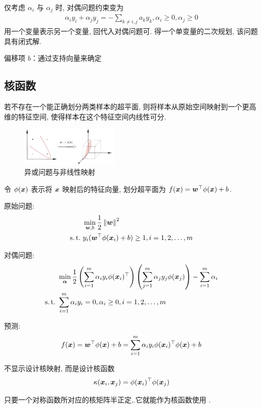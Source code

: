 仅考虑 $\alpha_i$ 与 $\alpha_j$ 时, 对偶问题约束变为
\begin{align*}
    \alpha_iy_i+\alpha_jy_j=-\sum_{k\ne i,j}a_ky_k, \alpha_i\ge0, \alpha_j\ge 0
\end{align*}
用一个变量表示另一个变量, 回代入对偶问题可. 得一个单变量的二次规划, 该问题具有闭式解.

偏移项 $b$：通过支持向量来确定


\subsection{核函数}
若不存在一个能正确划分两类样本的超平面, 则将样本从原始空间映射到一个更高维的特征空间, 使得样本在这个特征空间内线性可分.

\begin{figure}[!htb]
    \centering
    \includegraphics[width=0.42\textwidth]{pic/ML6/异或问题与非线性映射}
    \caption{异或问题与非线性映射}
\end{figure}

令 $\phi(\bm{x})$ 表示将 $\bm{x}$ 映射后的特征向量, 划分超平面为 $f(\bm{x})=\bm{w}^\top \phi(\bm{x})+b$. 

原始问题:
\begin{align*}
    &\min_{\bw,b}\frac{1}{2}\norm{\bw}^2\\
    \st& y_i(\bw^\top \phi(\bx_i)+b)\ge 1,i=1,2,\dots,m
\end{align*}

对偶问题:
\begin{align*}
    &\min_{\bm\alpha}\frac{1}{2}\left( \sum_{i=1}^m \alpha_i y_i\phi(\bx_i)^\top\right)\left( \sum_{j=1}^m \alpha_j y_j\phi(\bx_j) \right)-\sum_{i=1}^m\alpha_i\\
    \st&\sum_{i=1}^m\alpha_i y_i=0, \alpha_i\ge0, i=1,2,\dots,m
\end{align*}

预测:
\begin{align*}
    f(\bm{x})=\bm{w}^\top\phi(\bm{x})+b=\sum_{i=1}^m\alpha_iy_i\phi(\bm{x}_i)^\top\phi(\bm{x})+b
\end{align*}

不显示设计核映射, 而是设计核函数
\begin{align*}
    \kappa(\bm{x}_i, \bm{x}_j)=\phi(\bm{x}_i)^\top \phi(\bm{x}_j)
\end{align*}
\begin{theorem}[Mercer]
    只要一个对称函数所对应的核矩阵半正定,.它就能作为核函数使用 .
\end{theorem}


